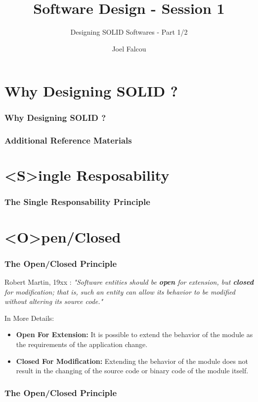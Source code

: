 \documentclass{beamer}
\title{Software Design - Session 1}
\subtitle{Designing SOLID Softwares  - Part 1/2}
\author{Joel Falcou}
\institute{Laboratoire de Recherche en Informatique - Université Paris Sud 11}
\date{}
\begin{document}
\begin{frame}[plain]
\titlepage
\end{frame}
\section{Why Designing SOLID ?}
\frame
{
  \frametitle{Why Designing SOLID ?}
  \begin{center}\end{center}
}

\frame
{

}

\frame
{
  \frametitle{Additional Reference Materials}
}

\section{<S>ingle Resposability}
\frame
{
  \frametitle{The Single Responsability Principle}
  \begin{center}\end{center}
}

\frame
{

}

\section{<O>pen/Closed}
\frame
{
  \frametitle{The Open/Closed Principle}
  \begin{block}{Robert Martin, 19xx :}
 \emph{"Software entities should be \textbf{open} for extension, but \textbf{closed} for modification; that is, such an entity can allow its behavior to be modified without altering its source code."}
  \end{block}

  \begin{block}{In More Details:}
  \begin{itemize}
  \footnotesize
  \item \textbf{Open For Extension:} It is possible to extend the behavior of the module as the requirements of the application change.
  \item \textbf{Closed For Modification:} Extending the behavior of the module does not result in the changing of the source code or binary code of the module itself.
\end{itemize}
  \end{block}

}

\frame
{
  \frametitle{The Open/Closed Principle}
  \begin{center}\end{center}
}

\frame
{
  \frametitle{}
}
\end{document}
